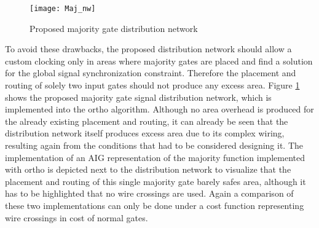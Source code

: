 \begin{figure}
	\centering
	\texttt{[image: Maj\_nw]}
	\caption{Proposed majority gate distribution network}\label{fig:QCA_Maj_nw}
\end{figure}


To avoid these drawbacks, the proposed distribution network should allow a custom clocking only in areas where majority gates are placed and find a solution for the global signal synchronization constraint. Therefore the placement and routing of solely two input gates should not produce any excess area. Figure \ref{fig:QCA_Maj_nw} shows the proposed majority gate signal distribution network, which is implemented into the ortho algorithm. Although no area overhead is produced for the already existing placement and routing, it can already be seen that the distribution network itself produces excess area due to its complex wiring, resulting again from the conditions that had to be considered designing it. The implementation of an AIG representation of the majority function implemented with ortho is depicted next to the distribution network to visualize that the placement and routing of this single majority gate barely safes area, although it has to be highlighted that no wire crossings are used. Again a comparison of these two implementations can only be done under a cost function representing wire crossings in cost of normal gates.
